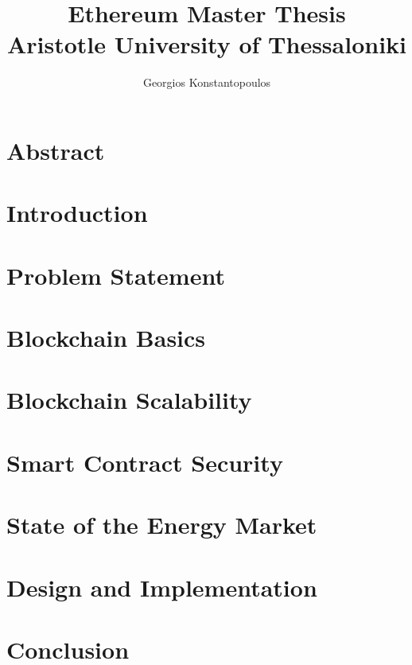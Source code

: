 \documentclass[12pt,twoside]{report}
\title{
	{Ethereum Master Thesis}\\
	{\large Aristotle University of Thessaloniki}\\
}
\author{Georgios Konstantopoulos}
\date{}
\begin{document}
\maketitle
\tableofcontents

\chapter{Abstract}




\chapter{Introduction}


\chapter{Problem Statement}


\chapter{Blockchain Basics}


\chapter{Blockchain Scalability}


\chapter{Smart Contract Security}


\chapter{State of the Energy Market}


\chapter{Design and Implementation}


\chapter{Conclusion}

\end{document}
